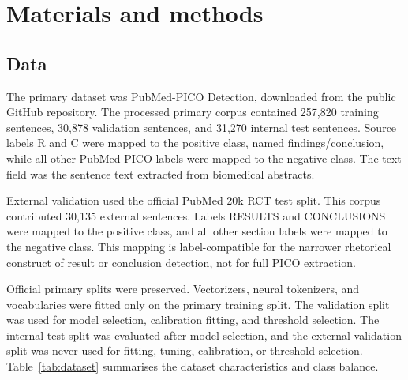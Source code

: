 \section*{Materials and methods}
\subsection*{Data}
The primary dataset was PubMed-PICO Detection, downloaded from the public GitHub repository. The processed primary corpus contained 257,820 training sentences, 30,878 validation sentences, and 31,270 internal test sentences. Source labels R and C were mapped to the positive class, named findings/conclusion, while all other PubMed-PICO labels were mapped to the negative class. The text field was the sentence text extracted from biomedical abstracts.

External validation used the official PubMed 20k RCT test split. This corpus contributed 30,135 external sentences. Labels RESULTS and CONCLUSIONS were mapped to the positive class, and all other section labels were mapped to the negative class. This mapping is label-compatible for the narrower rhetorical construct of result or conclusion detection, not for full PICO extraction.

Official primary splits were preserved. Vectorizers, neural tokenizers, and vocabularies were fitted only on the primary training split. The validation split was used for model selection, calibration fitting, and threshold selection. The internal test split was evaluated after model selection, and the external validation split was never used for fitting, tuning, calibration, or threshold selection. Table~\ref{tab:dataset} summarises the dataset characteristics and class balance.



